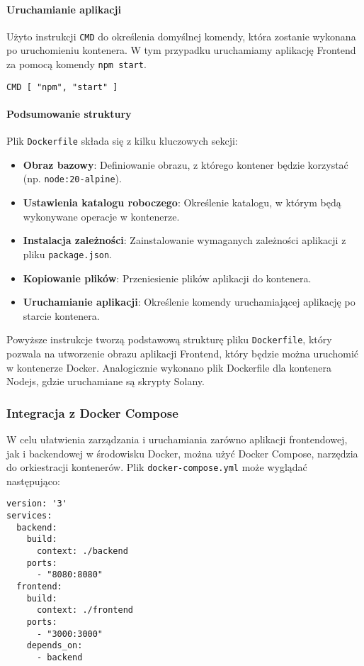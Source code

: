 \paragraph{Uruchamianie aplikacji}
Użyto instrukcji \texttt{CMD} do określenia domyślnej komendy, która zostanie wykonana po uruchomieniu kontenera. W tym przypadku uruchamiamy aplikację Frontend za pomocą komendy \texttt{npm start}.
\begin{lstlisting}
CMD [ "npm", "start" ]
\end{lstlisting}

\paragraph{Podsumowanie struktury}
Plik \texttt{Dockerfile} składa się z kilku kluczowych sekcji:
\begin{itemize}
    \item \textbf{Obraz bazowy}: Definiowanie obrazu, z którego kontener będzie korzystać (np. \texttt{node:20-alpine}).
    \item \textbf{Ustawienia katalogu roboczego}: Określenie katalogu, w którym będą wykonywane operacje w kontenerze.
    \item \textbf{Instalacja zależności}: Zainstalowanie wymaganych zależności aplikacji z pliku \texttt{package.json}.
    \item \textbf{Kopiowanie plików}: Przeniesienie plików aplikacji do kontenera.
    \item \textbf{Uruchamianie aplikacji}: Określenie komendy uruchamiającej aplikację po starcie kontenera.
\end{itemize}

Powyższe instrukcje tworzą podstawową strukturę pliku \texttt{Dockerfile}, który pozwala na utworzenie obrazu aplikacji Frontend, który będzie można uruchomić w kontenerze Docker. Analogicznie wykonano plik Dockerfile dla kontenera Nodejs, gdzie uruchamiane są skrypty Solany.

\subsubsection{Integracja z Docker Compose}
W celu ułatwienia zarządzania i uruchamiania zarówno aplikacji frontendowej, jak i backendowej w środowisku Docker, można użyć Docker Compose, narzędzia do orkiestracji kontenerów. Plik \texttt{docker-compose.yml} może wyglądać następująco:

\begin{lstlisting}
version: '3'
services:
  backend:
    build:
      context: ./backend
    ports:
      - "8080:8080"
  frontend:
    build:
      context: ./frontend
    ports:
      - "3000:3000"
    depends_on:
      - backend
\end{lstlisting}

